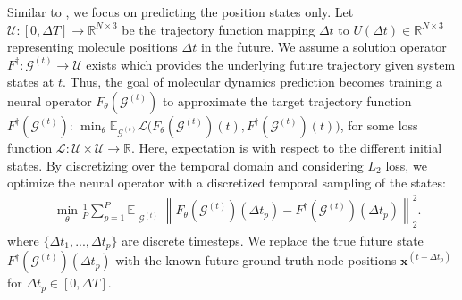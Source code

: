 Similar to \cite{xu_equivariant_2024}, we focus on predicting the position states only. Let $\mathcal{U} \colon [0, \Delta T] \rightarrow \mathbb R^{N \times  3}$ be the trajectory function mapping $\Delta t$ to $U(\Delta t) \in \mathbb R^{N \times  3}$ representing molecule positions $\Delta t$ in the future. We assume a solution operator $F^\dagger \colon \mathcal{G}^{(t)} \rightarrow \mathcal{U}$ exists which provides the underlying future trajectory given system states at $t$. Thus, the goal of molecular dynamics prediction becomes training a neural operator $F_\theta(\mathcal{G}^{(t)})$ to approximate the target trajectory function $F^\dagger(\mathcal{G}^{(t)})$: $\min_\theta \mathbb E_{\mathcal{G}^{(t)}} \mathcal{L} \big(F_\theta(\mathcal{G}^{(t)}) (t) , F^\dagger(\mathcal{G}^{(t)})(t) \big)$,
for some loss function $\mathcal{L} \colon \mathcal{U} \times \mathcal{U}\rightarrow \mathbb R$. Here, expectation is with respect to the different initial states.
By discretizing over the temporal domain and considering $L_2$ loss, we optimize the neural operator with a discretized temporal sampling of the states:
\begin{align}
    &\min_{\theta} \frac{1}{P} \sum_{p=1}^P \mathbb{E}_{\substack{
            \mathcal{G}^{(t)}  \\
            }
        } 
         \left\|
            F_\theta\left( \mathcal{G}^{(t)}  \right)(\Delta t_p) - F^\dagger \left (\mathcal{G}^{(t)} \right) (\Delta t_p)
        \right\|_{2}^{2}.
        \label{eq:objective_function}
\end{align}
where $\{ \Delta t_1, ..., \Delta t_p \}$ are discrete timesteps. We replace the true future state $F^\dagger(\mathcal{G}^{(t)})(\Delta t_p)$ with the known future ground truth node positions $\mathbf{x}^{(t+\Delta t_p)}$ for $\Delta t_p \in [0, \Delta T]$.

